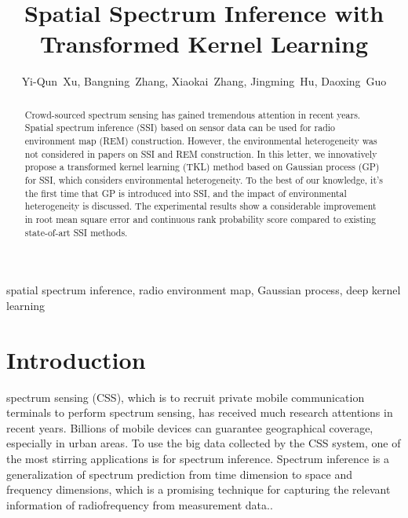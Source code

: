 \documentclass[journal, oneside, twocolumn]{IEEEtran}
\date{}
\title{Spatial Spectrum Inference with Transformed Kernel Learning}
\begin{document}
\author{
  Yi-Qun~Xu,
  Bangning~Zhang, %
  Xiaokai~Zhang, 
  Jingming~Hu, 
  Daoxing~Guo%

}


\maketitle

\begin{abstract}
Crowd-sourced spectrum sensing has gained tremendous attention in recent years. Spatial spectrum inference (SSI) based on sensor data can be used for radio environment map (REM) construction. However, the environmental heterogeneity was not considered in papers on SSI and REM construction. In this letter, we innovatively propose a transformed kernel learning (TKL) method based on Gaussian process (GP) for SSI, which considers environmental heterogeneity. To the best of our knowledge, it's the first time that GP is introduced into SSI, and the impact of environmental heterogeneity is discussed. The experimental results show a considerable improvement in root mean square error and continuous rank probability score compared to existing state-of-art SSI methods.
\end{abstract}

\begin{IEEEkeywords}
  spatial spectrum inference, radio environment map, Gaussian process, deep kernel learning
\end{IEEEkeywords}

\section{Introduction}
 spectrum sensing (CSS), which is to recruit private mobile communication terminals to perform spectrum sensing, has received much research attentions \cite{Ding2014, Jin2018, Han2019, Hu2020, Amin2020} in recent years. Billions of mobile devices can guarantee geographical coverage, especially in urban areas. To use the big data collected by the CSS system, one of the most stirring applications is for spectrum inference. Spectrum inference is a generalization of spectrum prediction from time dimension to space and frequency dimensions, which is a promising technique for capturing the relevant information of radiofrequency from measurement data.\cite{Ding2018}.
\end{document}
